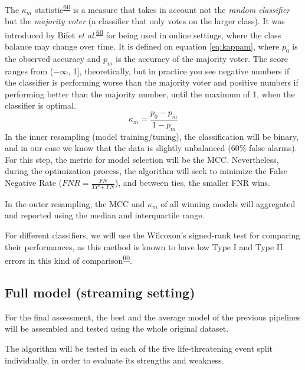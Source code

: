 \documentclass[12pt,twoside]{fmupthesis}
\begin{document}
The \(\kappa_m\) statistic\textsuperscript{\protect\hyperlink{ref-Bifet2015}{60}} is a measure that takes in account not the \emph{random classifier}
but the \emph{majority voter} (a classifier that only votes on the larger class). It was introduced by
Bifet \emph{et al.}\textsuperscript{\protect\hyperlink{ref-Bifet2015}{60}} for being used in online settings, where the class balance may change
over time. It is defined on equation \eqref{eq:kappam}, where \(p_0\) is the observed accuracy and
\(p_m\) is the accuracy of the majority voter. The score ranges from (\(-\infty\), 1{]}, theoretically,
but in practice you see negative numbers if the classifier is performing worse than the majority voter
and positive numbers if performing better than the majority number, until the maximum of 1, when the
classifier is optimal.
\begin{equation}
\kappa_m = \frac{p_0 - p_m}{1 - p_m} \label{eq:kappam}
\end{equation}
In the inner resampling (model training/tuning), the classification will be binary, and in our case
we know that the data is slightly unbalanced (60\% false alarms). For this step, the metric for model
selection will be the MCC. Nevertheless, during the optimization process, the algorithm will seek to
minimize the False Negative Rate (\(FNR = \frac{FN}{TP+FN}\)), and between ties, the smaller FNR wins.

In the outer resampling, the MCC and \(\kappa_m\) of all winning models will aggregated and reported
using the median and interquartile range.

For different classifiers, we will use the Wilcoxon's signed-rank test for comparing their performances,
as this method is known to have low Type I and Type II errors in this kind of comparison\textsuperscript{\protect\hyperlink{ref-Bifet2015}{60}}.

\hypertarget{full-model-streaming-setting}{%
\subsection{Full model (streaming setting)}\label{full-model-streaming-setting}}

For the final assessment, the best and the average model of the previous pipelines will be assembled
and tested using the whole original dataset.

The algorithm will be tested in each of the five life-threatening event split individually, in order
to evaluate its strengths and weakness.
\end{document}
